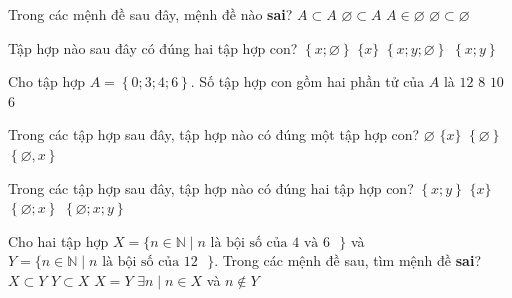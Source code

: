 \begin{ex}%
	Trong các mệnh đề sau đây, mệnh  đề nào \textbf{sai}?
	\choice 
		 {$A\subset A$}
		 {$\varnothing \subset A$}
		{$A\in  \varnothing$}
		{$\varnothing \subset \varnothing$} 
\end{ex}

\begin{ex}%
	Tập hợp  nào sau đây có đúng hai tập hợp con?
	\choice 
		 {$\left\{x;\varnothing \right\}$}
		 {\True $\{x\}$}
		 {$\left\{x;y;\varnothing \right\}$}
		{$\left\{x;y\right\}$} 
\end{ex}

\begin{ex}%
	Cho tập hợp $A=\left\{0;3;4;6\right\}$. Số tập hợp con gồm hai phần tử của  $A$ là
	\choice 
		{$12$} 
		{$8$} 
		 {$10$}
		{\True $6$} 
\end{ex}

\begin{ex}%
	Trong các tập hợp sau đây,  tập hợp nào có đúng một tập hợp con?
	\choice 
		{\True $\varnothing$} 
		{$\{x\}$} 
		{$\left\{\varnothing  \right\}$}
		{$\left\{\varnothing,  x\right\}$}
\end{ex}

\begin{ex}%
	Trong các tập hợp sau đây,  tập hợp nào có đúng hai tập hợp con?
	 \choice
		{$\left\{x;y\right\}$} 
		 {\True $\{x\}$}
		 {$\left\{\varnothing;x\right\}$}
		{$\left\{\varnothing;x;y\right\}$} 
\end{ex}

\begin{ex}%
	Cho hai tập  hợp $X=\{n\in \mathbb{N}\mid n \text{ là bội số của $4$ và $6$ }\}$ và $Y=\{n\in \mathbb{N}\mid n \text{ là bội số của $12$ }\}$. Trong các mệnh đề sau, tìm mệnh đề \textbf{sai}?
	 \choice
		 {$X\subset Y$}
		{$Y\subset  X$}
		{\True  $X=Y$}
		{$\exists n\mid  n\in X$ và $n\notin Y$}
\end{ex}

